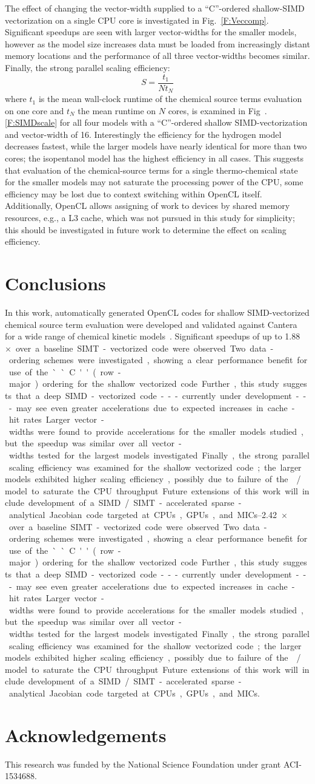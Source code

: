 \documentclass[12pt]{ussci}
\begin{document}
The effect of changing the vector-width supplied to a ``C''-ordered shallow-SIMD vectorization on a single CPU core is investigated in Fig.~\ref{F:Veccomp}.
Significant speedups are seen with larger vector-widths for the smaller models, however as the model size increases data must be loaded from increasingly distant memory locations and the performance of all three vector-widths becomes similar.
Finally, the strong parallel scaling efficiency:
\begin{equation}
S = \frac{t_1}{N t_N}
\end{equation}
where $t_1$ is the mean wall-clock runtime of the chemical source terms evaluation on one core and $t_N$ the mean runtime on $N$ cores, is examined in Fig~.\ref{F:SIMDscale} for all four models with a ``C''-ordered shallow SIMD-vectorization and vector-width of 16.
Interestingly the efficiency for the hydrogen model decreases fastest, while the larger models have nearly identical for more than two cores; the isopentanol model has the highest efficiency in all cases.
This suggests that evaluation of the chemical-source terms for a single thermo-chemical state for the smaller models may not saturate the processing power of the CPU, some efficiency may be lost due to context switching within OpenCL itself.
Additionally, OpenCL allows assigning of work to devices by shared memory resources, e.g., a L3 cache, which was not pursued in this study for simplicity; this should be investigated in future work to determine the effect on scaling efficiency.

\section{Conclusions}
In this work, automatically generated OpenCL codes for shallow SIMD-vectorized chemical source term evaluation were developed and validated against Cantera~\cite{Cantera} for a wide range of chemical kinetic models~\cite{Burke:2011fh,smith_gri-mech_30,Wang:2007,Sarathy:2013jr}.
Significant speedups of up to \SIrange{1.88}{2.42}{$\times$} over a baseline SIMT-vectorized code were observed.
Two data-ordering schemes were investigated, showing a clear performance benefit for use of the ``C'' (row-major) ordering for the shallow vectorized code.
Further, this study suggests that a deep SIMD-vectorized code---currently under development---may see even greater accelerations due to expected increases in cache-hit rates.
Larger vector-widths were found to provide accelerations for the smaller models studied, but the speedup was similar over all vector-widths tested for the largest models investigated.
Finally, the strong parallel scaling efficiency was examined for the shallow vectorized code; the larger models exhibited higher scaling efficiency, possibly due to failure of the \slash{} model to saturate the CPU throughput.
Future extensions of this work will include development of a SIMD\slash SIMT-accelerated sparse-analytical Jacobian code targeted at CPUs, GPUs, and MICs.

\section{Acknowledgements}
This research was funded by the National Science Foundation under grant ACI-1534688.

\printbibliography[heading=bibintoc]
\end{document}
